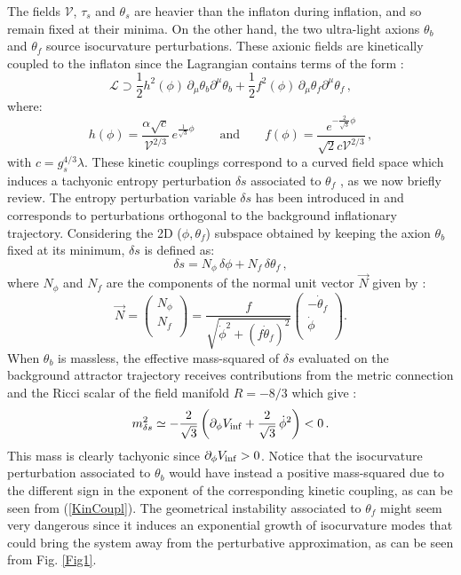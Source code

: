 \documentclass[aps,prd,a4paper,twocolumn,amsmath,showpacs,superscriptaddress,nofootinbib,preprintnumbers]{revtex4-1}
\newcommand{\be}{\begin{equation}}
\newcommand{\ee}{\end{equation}}
\newcommand{\mc}{\mathcal}
\newcommand{\vo}{\mathcal{V}}
\begin{document}
The fields $\vo$, $\tau_s$ and $\theta_s$ are heavier than the inflaton during inflation, and so remain fixed at their minima. On the other hand, the two ultra-light axions $\theta_b$ and $\theta_f$ source isocurvature perturbations. These axionic fields are kinetically coupled to the inflaton since the Lagrangian contains terms of the form \cite{Cicoli:2018ccr}:
\be
\mc{L}\supset \frac12 h^2(\phi)\,\partial_\mu \theta_b\partial^\mu \theta_b + \frac12  f^2(\phi)\,\partial_\mu \theta_f \partial^\mu \theta_f\,,
\ee
where:
\be
h(\phi) = \frac{\alpha\sqrt{c}}{\vo^{2/3}}\,e^{\frac{1}{\sqrt{3}}\phi}
\qquad\text{and}\qquad
f(\phi) = \frac{e^{-\frac{2}{\sqrt{3}}\phi}}{\sqrt{2} c \vo^{2/3}}\,,
\label{KinCoupl}
\ee
with $c = g_s^{4/3} \lambda$. These kinetic couplings correspond to a curved field space which induces a tachyonic entropy perturbation $\delta s$ associated to $\theta_f$ \cite{Cicoli:2018ccr}, as we now briefly review. The entropy perturbation variable $\delta s$ has been introduced in \cite{Gordon:2000hv} and corresponds to perturbations orthogonal to the background inflationary trajectory. Considering the 2D ($\phi,\theta_f$) subspace obtained by keeping the axion $\theta_b$ fixed at its minimum, $\delta s$ is defined as:
\be
\delta s = N_\phi\, \delta\phi + N_f\, \delta\theta_f\,,
\ee
where $N_\phi$ and $N_f$ are the components of the normal unit vector $\vec{N}$ given by \cite{Achucarro:2010da,Cremonini:2010sv}:
\be
\vec{N} = \left(\begin{matrix}
           N_\phi \\
           N_f \\
           \end{matrix}\right)
           = \frac{f}{\sqrt{\dot\phi^2 + (f \dot\theta_f)^2}}\left(\begin{matrix}
           - \dot\theta_f \\
           \dot\phi \\
           \end{matrix}\right).
\ee
When $\theta_b$ is massless, the effective mass-squared of $\delta s$ evaluated on the background attractor trajectory receives contributions from the metric connection and the Ricci scalar of the field manifold $R=-8/3$ which give \cite{Cicoli:2019ulk}:
\be
m_{\delta s}^2\simeq -\frac{2}{\sqrt{3}}\left( \partial_\phi V_{\rm inf} + \frac{2}{\sqrt{3}}\,\dot{\phi}^2\right)<0 \,.
\label{eq:meffULF}
\ee
This mass is clearly tachyonic since $\partial_\phi V_{\rm inf}>0$. Notice that the isocurvature perturbation associated to $\theta_b$ would have instead a positive mass-squared due to the different sign in the exponent of the corresponding kinetic coupling, as can be seen from (\ref{KinCoupl}). The geometrical instability associated to $\theta_f$ might seem very dangerous since it induces an exponential growth of isocurvature modes that could bring the system away from the perturbative approximation, as can be seen from Fig. \ref{Fig1}. 
\end{document}
